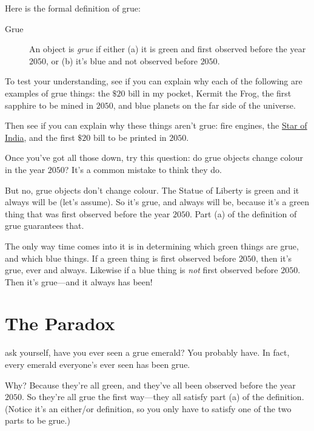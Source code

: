 \documentclass[justified]{tufte-book}
\theoremstyle{definition}
\theoremstyle{definition}
\theoremstyle{definition}
\theoremstyle{remark}
\begin{document}
Here is the formal definition of grue:

\begin{description}
\item[Grue]
An object is \emph{grue} if either (a) it is green and first observed before the year \(2050\), or (b) it's blue and not observed before \(2050\).
\end{description}

To test your understanding, see if you can explain why each of the following are examples of grue things: the \(\$20\) bill in my pocket, Kermit the Frog, the first sapphire to be mined in \(2050\), and blue planets on the far side of the universe.

Then see if you can explain why these things aren't grue: fire engines, the \href{https://en.wikipedia.org/wiki/Star_of_India_(gem)}{Star of India}, and the first \(\$20\) bill to be printed in \(2050\).

Once you've got all those down, try this question: do grue objects change colour in the year \(2050\)? It's a common mistake to think they do.

But no, grue objects don't change colour. The Statue of Liberty is green and it always will be (let's assume). So it's grue, and always will be, because it's a green thing that was first observed before the year \(2050\). Part (a) of the definition of grue guarantees that.

The only way time comes into it is in determining which green things are grue, and which blue things. If a green thing is first observed before \(2050\), then it's grue, ever and always. Likewise if a blue thing is \emph{not} first observed before \(2050\). Then it's grue---and it always has been!

\hypertarget{the-paradox}{%
\section*{The Paradox}\label{the-paradox}}

 ask yourself, have you ever seen a grue emerald? You probably have. In fact, every emerald everyone's ever seen has been grue.

Why? Because they're all green, and they've all been observed before the year \(2050\). So they're all grue the first way---they all satisfy part (a) of the definition. (Notice it's an either/or definition, so you only have to satisfy one of the two parts to be grue.)
\end{document}
